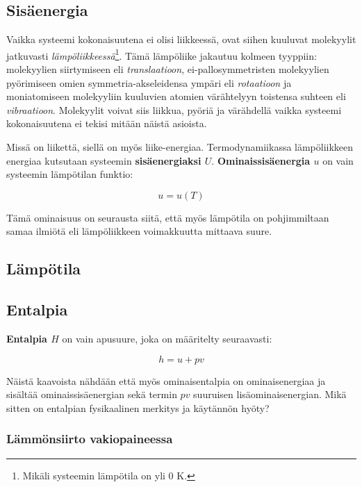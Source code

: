 \documentclass[12pt,a4paper,finnish]{book}
\begin{document}
\newpage %

\subsection{Sisäenergia}

Vaikka systeemi kokonaisuutena ei olisi liikkeessä, ovat siihen kuuluvat molekyylit jatkuvasti 
\textit{lämpöliikkeessä}\footnote{Mikäli systeemin lämpötila on yli 0 K.}. Tämä lämpöliike jakautuu kolmeen tyyppiin: molekyylien 
siirtymiseen eli \textit{translaatioon}, ei-pallosymmetristen molekyylien pyörimiseen omien symmetria-akseleidensa ympäri eli 
\textit{rotaatioon} ja moniatomiseen molekyyliin kuuluvien atomien värähtelyyn toistensa suhteen eli \textit{vibraatioon}. 
Molekyylit voivat siis liikkua, pyöriä ja värähdellä vaikka systeemi kokonaisuutena ei tekisi mitään näistä asioista.

Missä on liikettä, siellä on myös liike-energiaa. Termodynamiikassa lämpöliikkeen energiaa kutsutaan systeemin 
\textbf{sisäenergiaksi $U$}. \textbf{Ominaissisäenergia $u$} on vain systeemin lämpötilan funktio:

\begin{equation}
 u = u(T)
\end{equation}

Tämä ominaisuus on seurausta siitä, että myös lämpötila on pohjimmiltaan samaa ilmiötä eli lämpöliikkeen voimakkuutta mittaava suure.

\subsection{Lämpötila}

\subsection{Entalpia}

\textbf{Entalpia $H$} on vain apusuure, joka on määritelty seuraavasti:

\begin{equation}
 h = u + pv
\end{equation}

Näistä kaavoista nähdään että myös ominaisentalpia on ominaisenergiaa ja sisältää ominaissisäenergian sekä termin $pv$ 
suuruisen lisäominaisenergian. Mikä sitten on entalpian fysikaalinen merkitys ja käytännön hyöty?


\subsubsection{Lämmönsiirto vakiopaineessa}
\end{document}

